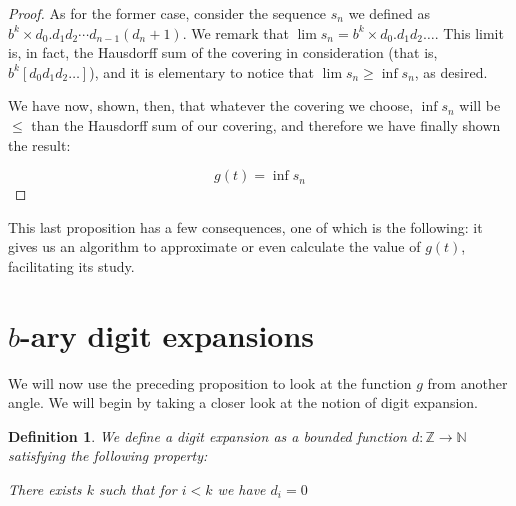 \documentclass[11pt, reqno]{amsart}
\newcommand{\Z}{\mathbb{Z}}
\newcommand{\N}{\mathbb{N}}
\newtheorem{definition}{Definition}
\begin{document}
\begin{proof}
As for the former case, consider the sequence $s_n$ we defined as $b^k \times d_0 . d_1 d_2 \cdots d_{n-1} (d_n + 1)$. We remark that $\lim s_n = b^k \times d_0 . d_1 d_2 \dots$. This limit is, in fact, the Hausdorff sum of the covering in consideration (that is, $b^k [d_0 d_1 d_2 \dots]$), and it is elementary to notice that $\lim s_n \geq \inf s_n$, as desired.

We have now, shown, then, that whatever the covering we choose, $\inf s_n$ will be $\leq$ than the Hausdorff sum of our covering, and therefore we have finally shown the result:

\[ g(t) = \inf s_n \]

\iffalse
Now, to show we can assume all intervals to be disjoint: fix any point $a$ in $\cup I_i$. Define $J_a$ to be \emph{the biggest interval in $A$ containing $a$}. We propose, now, that the covering $A' = \{ J_a \}$ covers exactly the same points as $A$, while having a Hausdorff sum less than or equal to that of $A$, as well as having all its intervals be disjoint.

The first two properties are trivial, so we devote our attention only to the third one: suppose, for the sake of argument, that $J_a$ and $J_b$ are not disjoint. The structure of the $b$-ary intervals mandates that either $J_a \subseteq J_b$ or $J_b \subseteq J_a$; suppose the former for the sake of argument. Then, $a \in J_b$, which implies $J_a$ is of length greater than or equal to that of $J_b$ (by definition), and so, in fact, $J_a = J_b$.

This digression completed, we may go back to the problem at hand.
\fi
\end{proof}

This last proposition has a few consequences, one of which is the following: it gives us an algorithm to approximate or even calculate the value of $g(t)$, facilitating its study.

\section{$b$-ary digit expansions}\label{sec7}

We will now use the preceding proposition to look at the function $g$ from another angle. We will begin by taking a closer look at the notion of digit expansion.

\begin{definition}
We define a \emph{digit expansion} as a \emph{bounded} function $d : \Z \to \N$ satisfying the following property:

\begin{center}
There exists $k$ such that for $i < k$ we have $d_i = 0$
\end{center}
\end{definition}
\end{document}
